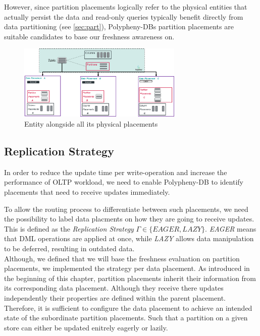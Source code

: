 However, since partition placements logically refer to the physical entities that actually persist the data and 
read-only queries typically benefit directly from data partitioning (see \ref{sec:part}), Polypheny-DBs partition placements 
are suitable candidates to base our freshness awareness on.


\begin{figure}[t]
    \centering
    \includegraphics[width=0.7\textwidth]{Figures/entity_placements_replication.png}
    \caption{Entity alongside all its physical placements}
    \label{fig:placements}
\end{figure}




\subsection{Replication Strategy}
\label{sec:strategy}

In order to reduce the update time per write-operation and increase the performance
of OLTP workload, we need to enable Polypheny-DB to identify placements that need to receive updates immediately. 

To allow the routing process to differentiate between such placements,
we need the possibility to label data placments on how they are going to receive updates. This is defined as the \emph{Replication Strategy} $\Gamma \in \{EAGER,LAZY\}$.
\emph{EAGER} means that DML operations are applied at once, while \emph{LAZY}
allows data manipulation to be deferred, resulting in outdated data.\\


Although, we defined that we will base the freshness evaluation on partition placements, we implemented the strategy per data placement. 
As introduced in the beginning of this chapter, partition placements inherit their information from its corresponding data placement.
Although they receive there updates independently their properties are defined within the parent placement. 
Therefore, it is sufficient to configure the data placement to achieve an intended state of the subordinate partition placements.
Such that a partition on a given store can either be updated enitrely eagerly or lazily. 

